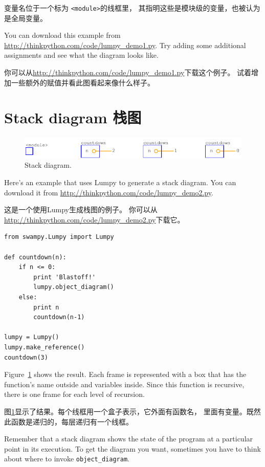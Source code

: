 \documentclass[10pt]{book}
\begin{document}
\begin{CJK}{UTF8}{gbsn}
变量名位于一个标为 \verb"<module>"的线框里，
其指明这些是模块级的变量，也被认为是全局变量。

You can download this example from
\url{http://thinkpython.com/code/lumpy_demo1.py}.  Try adding some
additional assignments and see what the diagram looks like.

你可以从\url{http://thinkpython.com/code/lumpy_demo1.py}下载这个例子。
试着增加一些额外的赋值并看此图看起来像什么样子。


\section{Stack diagram 栈图}

\begin{figure}
\centerline
{\includegraphics[scale=0.7]{figs/lumpydemo2.pdf}}
\caption{Stack diagram.}
\label{fig.lumpy2}
\end{figure}

Here's an example that uses Lumpy to generate a stack diagram.
You can download it from \url{http://thinkpython.com/code/lumpy_demo2.py}.

这是一个使用Lumpy生成栈图的例子。
你可以从\url{http://thinkpython.com/code/lumpy_demo2.py}下载它。

\begin{verbatim}
from swampy.Lumpy import Lumpy

def countdown(n):
    if n <= 0:
        print 'Blastoff!'
        lumpy.object_diagram()
    else:
        print n
        countdown(n-1)

lumpy = Lumpy()
lumpy.make_reference()
countdown(3)
\end{verbatim}

Figure~\ref{fig.lumpy2} shows the result.  Each frame is represented
with a box that has the function's name outside and variables inside.
Since this function is recursive, there is one frame for each
level of recursion.

图\ref{fig.lumpy2}显示了结果。每个线框用一个盒子表示，它外面有函数名，
里面有变量。既然此函数是递归的，每层递归有一个线框。

Remember that a stack diagram shows the state of the program at
a particular point in its execution.  To get the diagram you want,
sometimes you have to think about where to invoke \verb"object_diagram".


\end{CJK}
\end{document}
